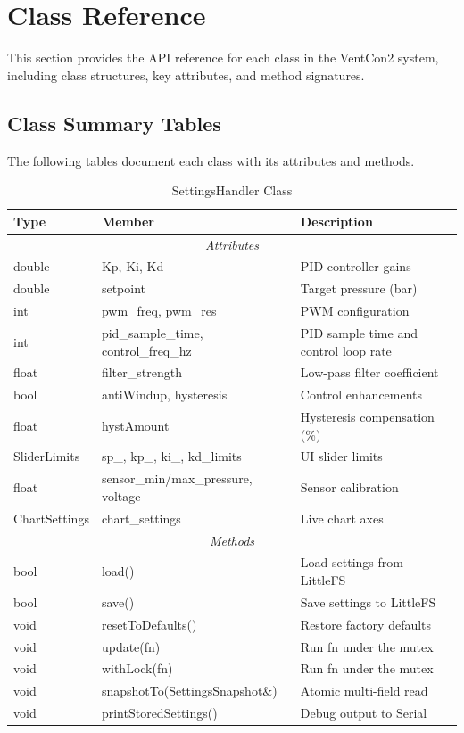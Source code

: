 
\section{Class Reference}

This section provides the API reference for each class in the VentCon2 system, including class structures, key attributes, and method signatures.

\subsection{Class Summary Tables}
The following tables document each class with its attributes and methods.

\begin{table}[H]
\centering
\caption{SettingsHandler Class}
\label{tab:settings-handler}
\begin{tabular}{|l|l|p{6cm}|}
\hline
\textbf{Type} & \textbf{Member} & \textbf{Description} \\
\hline
\multicolumn{3}{|c|}{\textit{Attributes}} \\
\hline
double & Kp, Ki, Kd & PID controller gains \\
double & setpoint & Target pressure (bar) \\
int & pwm\_freq, pwm\_res & PWM configuration \\
int & pid\_sample\_time, control\_freq\_hz & PID sample time and control loop rate \\
float & filter\_strength & Low-pass filter coefficient \\
bool & antiWindup, hysteresis & Control enhancements \\
float & hystAmount & Hysteresis compensation (\%) \\
SliderLimits & sp\_, kp\_, ki\_, kd\_limits & UI slider limits \\
float & sensor\_min/max\_pressure, voltage & Sensor calibration \\
ChartSettings & chart\_settings & Live chart axes \\
\hline
\multicolumn{3}{|c|}{\textit{Methods}} \\
\hline
bool & load() & Load settings from LittleFS \\
bool & save() & Save settings to LittleFS \\
void & resetToDefaults() & Restore factory defaults \\
void & update(fn) & Run fn under the mutex \\
void & withLock(fn) & Run fn under the mutex \\
void & snapshotTo(SettingsSnapshot\&) & Atomic multi-field read \\
void & printStoredSettings() & Debug output to Serial \\
\hline
\end{tabular}
\end{table}

